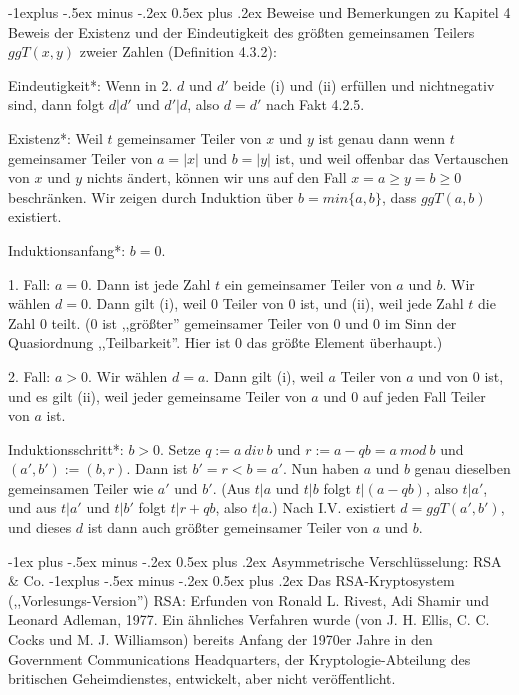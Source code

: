 \documentclass[a4paper]{article}
\makeatletter
\renewcommand{\section}{\@startsection{section}{1}{0mm}%
 {-1ex plus -.5ex minus -.2ex}%
 {0.5ex plus .2ex}%
 {\normalfont\large\bfseries}}
\renewcommand{\subsection}{\@startsection{subsection}{2}{0mm}%
 {-1explus -.5ex minus -.2ex}%
 {0.5ex plus .2ex}%
 {\normalfont\normalsize\bfseries}}
\makeatother
\begin{document}
\begin{multicols}{3}
        \subsection{Beweise und Bemerkungen zu Kapitel 4}
        Beweis der Existenz und der Eindeutigkeit des größten gemeinsamen Teilers $ggT(x,y)$ zweier Zahlen (Definition 4.3.2):
        \begin{itemize*}
            \item *Eindeutigkeit*: Wenn in 2. $d$ und $d'$ beide (i) und (ii) erfüllen und nichtnegativ sind, dann folgt $d|d'$ und $d'|d$, also $d=d'$ nach Fakt 4.2.5.
            \item *Existenz*: Weil $t$ gemeinsamer Teiler von $x$ und $y$ ist genau dann wenn $t$ gemeinsamer Teiler von $a=|x|$ und $b=|y|$ ist, und weil offenbar das Vertauschen von $x$ und $y$ nichts ändert, können wir uns auf den Fall $x=a\geq y=b\geq 0$ beschränken. Wir zeigen durch Induktion über $b=min\{a,b\}$, dass $ggT(a,b)$ existiert.
            \item *Induktionsanfang*: $b=0$.
            \item 1. Fall: $a= 0$. Dann ist jede Zahl $t$ ein gemeinsamer Teiler von $a$ und $b$. Wir wählen $d=0$. Dann gilt (i), weil $0$ Teiler von $0$ ist, und (ii), weil jede Zahl $t$ die Zahl $0$ teilt. ($0$ ist ,,größter'' gemeinsamer Teiler von 0 und 0 im Sinn der Quasiordnung ,,Teilbarkeit''. Hier ist 0 das größte Element überhaupt.)
            \item 2. Fall: $a >0$. Wir wählen $d=a$. Dann gilt (i), weil $a$ Teiler von $a$ und von 0 ist, und es gilt (ii), weil jeder gemeinsame Teiler von $a$ und 0 auf jeden Fall Teiler von $a$ ist.
            \item *Induktionsschritt*: $b>0$. Setze $q:=a\ div\ b$ und $r:=a-qb=a\ mod\ b$ und $(a',b'):=(b,r)$. Dann ist $b'=r < b=a'$. Nun haben $a$ und $b$ genau dieselben gemeinsamen Teiler wie $a'$ und $b'$. (Aus $t|a$ und $t|b$ folgt $t|(a-qb)$, also $t|a'$, und aus $t|a'$ und $t|b'$ folgt $t|r+qb$, also $t|a$.) Nach I.V. existiert $d= ggT(a',b')$, und dieses $d$ ist dann auch größter gemeinsamer Teiler von $a$ und $b$.
        \end{itemize*}


        \section{Asymmetrische Verschlüsselung: RSA \& Co.}
        \subsection{Das RSA-Kryptosystem (,,Vorlesungs-Version'')}
        RSA: Erfunden von Ronald L. Rivest, Adi Shamir und Leonard Adleman, 1977. Ein ähnliches Verfahren wurde (von J. H. Ellis, C. C. Cocks und M. J. Williamson) bereits Anfang der 1970er Jahre in den Government Communications Headquarters, der Kryptologie-Abteilung des britischen Geheimdienstes, entwickelt, aber nicht veröffentlicht.


\end{multicols}
\end{document}
